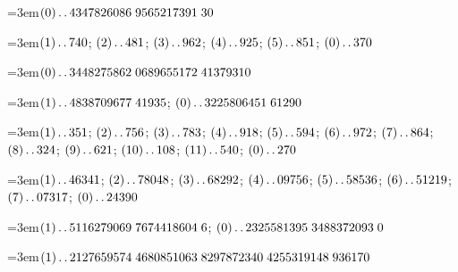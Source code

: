 \par\noindent\hangindent=3em\enspace $(0)\mathinner{.\,.}4347826086\;\allowbreak 9565217391\;\allowbreak 30$\par\smallskip

\par\noindent\hangindent=3em\enspace $(1)\mathinner{.\,.}740$; $(2)\mathinner{.\,.}481$; $(3)\mathinner{.\,.}962$; $(4)\mathinner{.\,.}925$; $(5)\mathinner{.\,.}851$; $(0)\mathinner{.\,.}370$\par\smallskip

\par\noindent\hangindent=3em\enspace $(0)\mathinner{.\,.}3448275862\;\allowbreak 0689655172\;\allowbreak 41379310$\par\smallskip

\par\noindent\hangindent=3em\enspace $(1)\mathinner{.\,.}4838709677\;\allowbreak 41935$; $(0)\mathinner{.\,.}3225806451\;\allowbreak 61290$\par\smallskip

\par\noindent\hangindent=3em\enspace $(1)\mathinner{.\,.}351$; $(2)\mathinner{.\,.}756$; $(3)\mathinner{.\,.}783$; $(4)\mathinner{.\,.}918$; $(5)\mathinner{.\,.}594$; $(6)\mathinner{.\,.}972$; $(7)\mathinner{.\,.}864$; $(8)\mathinner{.\,.}324$; $(9)\mathinner{.\,.}621$; $(10)\mathinner{.\,.}108$; $(11)\mathinner{.\,.}540$; $(0)\mathinner{.\,.}270$\par\smallskip

\par\noindent\hangindent=3em\enspace $(1)\mathinner{.\,.}46341$; $(2)\mathinner{.\,.}78048$; $(3)\mathinner{.\,.}68292$; $(4)\mathinner{.\,.}09756$; $(5)\mathinner{.\,.}58536$; $(6)\mathinner{.\,.}51219$; $(7)\mathinner{.\,.}07317$; $(0)\mathinner{.\,.}24390$\par\smallskip

\par\noindent\hangindent=3em\enspace $(1)\mathinner{.\,.}5116279069\;\allowbreak 7674418604\;\allowbreak 6$; $(0)\mathinner{.\,.}2325581395\;\allowbreak 3488372093\;\allowbreak 0$\par\smallskip

\par\noindent\hangindent=3em\enspace $(1)\mathinner{.\,.}2127659574\;\allowbreak 4680851063\;\allowbreak 8297872340\;\allowbreak 4255319148\;\allowbreak 936170$\par\smallskip

